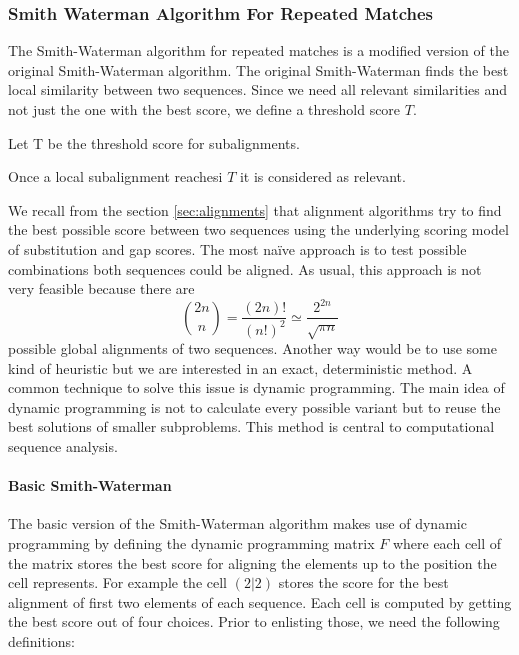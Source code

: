 \subsubsection{Smith Waterman Algorithm For Repeated Matches}
The Smith-Waterman algorithm for repeated matches\cite{durbin1998} is a modified version of the original Smith-Waterman algorithm\cite{waterman1981}.
The original Smith-Waterman finds the best local similarity between two sequences.
Since we need all relevant similarities and not just the one with the best score, we define a threshold score $T$.
\begin{definition}
	Let T be the threshold score for subalignments.
	\label{def:treshold}
\end{definition}
Once a local subalignment reachesi $T$ it is considered as relevant.

We recall from the section \ref{sec:alignments} that alignment algorithms try to find the best possible score between two sequences using the underlying scoring model of substitution and gap scores.
The most na\"ive approach is to test possible combinations both sequences could be aligned. As usual, this approach is not very feasible because there are
\begin{equation*}
	\binom{2n}{n} = \frac{(2n)!}{(n!)^2} \simeq \frac{2^{2n}}{\sqrt{\pi n}}
\end{equation*}
possible global alignments of two sequences\cite{durbin1998}.
Another way would be to use some kind of heuristic but we are interested in an exact, deterministic method.
A common technique to solve this issue is dynamic programming\cite{bellman1957}.
The main idea of dynamic programming is not to calculate every possible variant but to reuse the best solutions of smaller subproblems.
This method is central to computational sequence analysis\cite{durbin1998}.

\paragraph{Basic Smith-Waterman}
The basic version of the Smith-Waterman algorithm makes use of dynamic programming by defining the dynamic programming matrix $F$ where each cell of the matrix stores the best score for aligning the elements up to the position the cell represents.
For example the cell $(2|2)$ stores the score for the best alignment of first two elements of each sequence.
Each cell is computed by getting the best score out of four choices. Prior to enlisting those, we need the following definitions:

